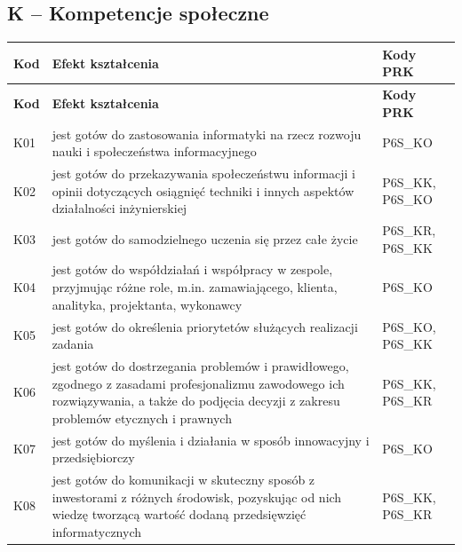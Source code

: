 \documentclass[12pt,a4paper]{article}
\newcommand{\thdrule}{\noalign{\global\setlength{\extrarowheight}{0pt}}}
\newcommand{\thdend}{\noalign{\global\setlength{\extrarowheight}{4pt}}}
\begin{document}
\subsection*{K -- Kompetencje społeczne}

{\scriptsize
\begin{longtable}{m{1cm}m{9.5cm}m{3.9cm}}
\thdrule\toprule
\rowcolor{pjatkRed} {\color{white}\footnotesize\textbf{\vphantom{Ag}Kod}} & {\color{white}\footnotesize\textbf{\vphantom{Ag}Efekt kształcenia}} & {\color{white}\footnotesize\textbf{\vphantom{Ag}Kody PRK}} \\
\midrule\thdend
\endfirsthead
\thdrule\toprule
\rowcolor{pjatkRed} {\color{white}\footnotesize\textbf{\vphantom{Ag}Kod}} & {\color{white}\footnotesize\textbf{\vphantom{Ag}Efekt kształcenia}} & {\color{white}\footnotesize\textbf{\vphantom{Ag}Kody PRK}} \\
\midrule\thdend
\endhead
\rowcolor{tableRowLight} K01 & jest gotów do zastosowania informatyki na rzecz rozwoju nauki i społeczeństwa informacyjnego & {\scriptsize P6S\_KO} \\
\rowcolor{tableRowAlt} K02 & jest gotów do przekazywania społeczeństwu informacji i opinii dotyczących osiągnięć techniki i innych aspektów działalności inżynierskiej & {\scriptsize P6S\_KK, P6S\_KO} \\
\rowcolor{tableRowLight} K03 & jest gotów do samodzielnego uczenia się przez całe życie & {\scriptsize P6S\_KR, P6S\_KK} \\
\rowcolor{tableRowAlt} K04 & jest gotów do współdziałań i współpracy w zespole, przyjmując różne role, m.in. zamawiającego, klienta, analityka, projektanta, wykonawcy & {\scriptsize P6S\_KO} \\
\rowcolor{tableRowLight} K05 & jest gotów do określenia priorytetów służących realizacji zadania & {\scriptsize P6S\_KO, P6S\_KK} \\
\rowcolor{tableRowAlt} K06 & jest gotów do dostrzegania problemów i prawidłowego, zgodnego z zasadami profesjonalizmu zawodowego ich rozwiązywania, a także do podjęcia decyzji z zakresu problemów etycznych i prawnych & {\scriptsize P6S\_KK, P6S\_KR} \\
\rowcolor{tableRowLight} K07 & jest gotów do myślenia i działania w sposób innowacyjny i przedsiębiorczy & {\scriptsize P6S\_KO} \\
\rowcolor{tableRowAlt} K08 & jest gotów do  komunikacji w skuteczny sposób z inwestorami z różnych środowisk, pozyskując od nich wiedzę tworzącą wartość dodaną przedsięwzięć informatycznych & {\scriptsize P6S\_KK, P6S\_KR} \\
\bottomrule
\end{longtable}}
\end{document}
